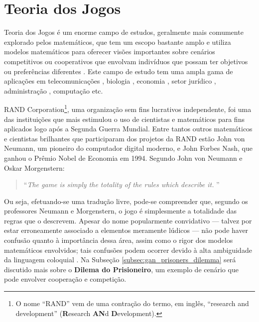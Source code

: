 \section{Teoria dos Jogos}
\label{sec:gan_game_theory}

Teoria dos Jogos é um enorme campo de estudos, geralmente mais comumente explorado pelos matemáticos, que tem um escopo bastante amplo e utiliza modelos matemáticos para oferecer visões importantes sobre cenários competitivos ou cooperativos que envolvam indivíduos que possam ter objetivos ou preferências diferentes \citep{myerson1997game}. Este campo de estudo tem uma ampla gama de aplicações em telecomunicações \citep{han2012game}, biologia \citep{smith1974theory}, economia \citep{Friedman1998, kreps1990game, gibbons1992game}, setor jurídico \citep{baird1998game}, administração \citep{sanfey2007social, camerer2011behavioral}, computação \citep{abraham2006distributed} etc.

RAND Corporation\footnote{O nome ``RAND'' vem de uma contração do termo, em inglês, ``research and development'' (\textbf{R}esearch \textbf{AN}d \textbf{D}evelopment).}, uma organização sem fins lucrativos independente, foi uma das instituições que mais estimulou o uso de cientistas e matemáticos para fins aplicados logo após a Segunda Guerra Mundial. Entre tantos outros matemáticos e cientistas brilhantes que participaram dos projetos da RAND estão John von Neumann, um pioneiro do computador digital moderno, e John Forbes Nash, que ganhou o Prêmio Nobel de Economia em 1994. Segundo John von Neumann e Oskar Morgenstern:

\begin{formal}
\begin{quote}
\begin{flushright}
    \textcolor{citeblue}{\textquotedblleft \textit{The game is simply the totality of the rules which describe it.} \textquotedblright}\\ \citep{10.2307/j.ctt1r2gkx}
\end{flushright}
\end{quote}
\end{formal}

Ou seja, efetuando-se uma tradução livre, pode-se compreender que, segundo os professores Neumann e Morgenstern, o jogo é simplesmente a totalidade das regras que o descrevem. Apesar do nome popularmente convidativo --- talvez por estar erroneamente associado a elementos meramente lúdicos --- não pode haver confusão quanto à importância dessa área, assim como o rigor dos modelos matemáticos envolvidos; tais confusões podem ocorrer devido à alta ambiguidade da linguagem coloquial \citep{10.2307/j.ctt1r2gkx}. Na Subseção \ref{subsec:gan_prisoners_dilemma} será discutido mais sobre o \textbf{Dilema do Prisioneiro}, um exemplo de cenário que pode envolver cooperação e competição.




